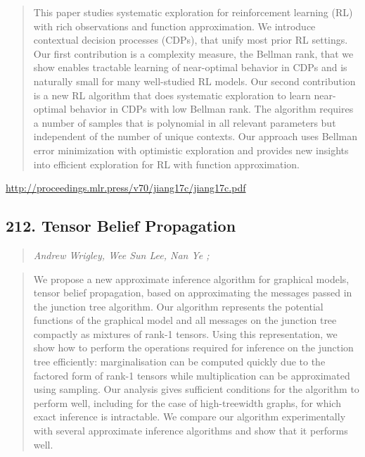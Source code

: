\documentclass{article}
\begin{document}
\begin{quote}
    This paper studies systematic exploration for reinforcement learning (RL) with rich observations and function approximation. We introduce contextual decision processes (CDPs), that unify most prior RL settings. Our first contribution is a complexity measure, the Bellman rank, that we show enables tractable learning of near-optimal behavior in CDPs and is naturally small for many well-studied RL models. Our second contribution is a new RL algorithm that does systematic exploration to learn near-optimal behavior in CDPs with low Bellman rank. The algorithm requires a number of samples that is polynomial in all relevant parameters but independent of the number of unique contexts. Our approach uses Bellman error minimization with optimistic exploration and provides new insights into efficient exploration for RL with function approximation.  
\end{quote}

\href{http://proceedings.mlr.press/v70/jiang17c/jiang17c.pdf}{http://proceedings.mlr.press/v70/jiang17c/jiang17c.pdf}

\subsection{212. Tensor Belief Propagation}

\begin{quote}
\footnotesize{\textit{Andrew Wrigley, Wee Sun Lee, Nan Ye ;}}

\end{quote}

\begin{quote}
    We propose a new approximate inference algorithm for graphical models, tensor belief propagation, based on approximating the messages passed in the junction tree algorithm. Our algorithm represents the potential functions of the graphical model and all messages on the junction tree compactly as mixtures of rank-1 tensors. Using this representation, we show how to perform the operations required for inference on the junction tree efficiently: marginalisation can be computed quickly due to the factored form of rank-1 tensors while multiplication can be approximated using sampling. Our analysis gives sufficient conditions for the algorithm to perform well, including for the case of high-treewidth graphs, for which exact inference is intractable. We compare our algorithm experimentally with several approximate inference algorithms and show that it performs well.  
\end{quote}
\end{document}
